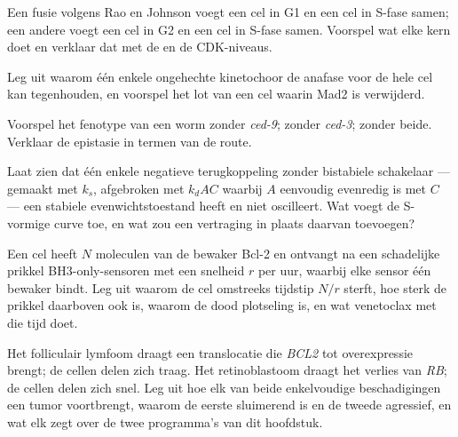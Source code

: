 \begin{exercise}[$\star\star$]\label{exo:b3:cell-cycle-apoptosis:7}
Een fusie volgens Rao en Johnson voegt een cel in G1 en een cel in
S-fase samen; een andere voegt een cel in G2 en een cel in S-fase
samen. Voorspel wat elke kern doet en verklaar dat met de
 en de CDK-niveaus.
\end{exercise}

\begin{exercise}[$\star\star$]\label{exo:b3:cell-cycle-apoptosis:8}
Leg uit waarom één enkele ongehechte kinetochoor de anafase voor de
hele cel kan tegenhouden, en voorspel het lot van een cel waarin Mad2
is verwijderd.
\end{exercise}

\begin{exercise}[$\star\star$]\label{exo:b3:cell-cycle-apoptosis:9}
Voorspel het fenotype van een worm zonder \emph{ced-9}; zonder
\emph{ced-3}; zonder beide. Verklaar de epistasie in termen van de
route.
\end{exercise}

\begin{exercise}[$\star\star\star$]\label{exo:b3:cell-cycle-apoptosis:10}
Laat zien dat één enkele negatieve terugkoppeling zonder bistabiele
schakelaar ---  gemaakt met $k_{s}$, afgebroken met $k_{d}AC$
waarbij $A$ eenvoudig evenredig is met $C$ --- een stabiele
evenwichtstoestand heeft en niet oscilleert. Wat voegt de S-vormige
curve toe, en wat zou een vertraging in plaats daarvan toevoegen?
\end{exercise}

\begin{exercise}[$\star\star\star$]\label{exo:b3:cell-cycle-apoptosis:11}
Een cel heeft $N$ moleculen van de bewaker Bcl-2 en ontvangt na een
schadelijke prikkel BH3-only-sensoren met een snelheid $r$ per uur,
waarbij elke sensor één bewaker bindt. Leg uit waarom de cel omstreeks
tijdstip $N/r$ sterft, hoe sterk de prikkel daarboven ook is, waarom de
dood plotseling is, en wat venetoclax met die tijd doet.
\end{exercise}

\begin{exercise}[$\star\star\star$]\label{exo:b3:cell-cycle-apoptosis:12}
Het folliculair lymfoom draagt een translocatie die \emph{BCL2} tot
overexpressie brengt; de cellen delen zich traag. Het retinoblastoom
draagt het verlies van \emph{RB}; de cellen delen zich snel. Leg uit
hoe elk van beide enkelvoudige beschadigingen een tumor voortbrengt,
waarom de eerste sluimerend is en de tweede agressief, en wat elk zegt
over de twee programma's van dit hoofdstuk.
\end{exercise}

